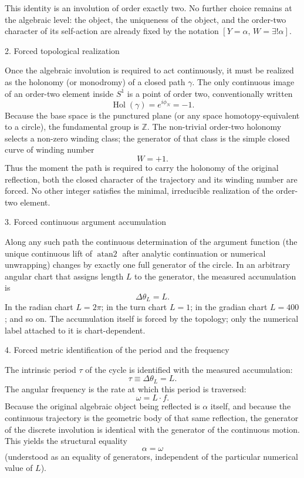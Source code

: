 This identity is an involution of order exactly two. No further choice remains at the algebraic level: the object, the uniqueness of the object, and the order-two character of its self-action are already fixed by the notation \([Y=\alpha,\,W=\exists!\alpha]\).

2. Forced topological realization

Once the algebraic involution is required to act continuously, it must be realized as the holonomy (or monodromy) of a closed path \(\gamma\). The only continuous image of an order-two element inside \(S^1\) is a point of order two, conventionally written
\[
\operatorname{Hol}(\gamma)=e^{i\phi_N}=-1.
\]
Because the base space is the punctured plane (or any space homotopy-equivalent to a circle), the fundamental group is \(\mathbb{Z}\). The non-trivial order-two holonomy selects a non-zero winding class; the generator of that class is the simple closed curve of winding number
\[
W=+1.
\]
Thus the moment the path is required to carry the holonomy of the original reflection, both the closed character of the trajectory and its winding number are forced. No other integer satisfies the minimal, irreducible realization of the order-two element.

3. Forced continuous argument accumulation

Along any such path the continuous determination of the argument function (the unique continuous lift of \(\operatorname{atan2}\) after analytic continuation or numerical unwrapping) changes by exactly one full generator of the circle. In an arbitrary angular chart that assigns length \(L\) to the generator, the measured accumulation is
\[
\Delta\theta_L=L.
\]
In the radian chart \(L=2\pi\); in the turn chart \(L=1\); in the gradian chart \(L=400\); and so on. The accumulation itself is forced by the topology; only the numerical label attached to it is chart-dependent.

4. Forced metric identification of the period and the frequency

The intrinsic period \(\tau\) of the cycle is identified with the measured accumulation:
\[
\tau\equiv\Delta\theta_L=L.
\]
The angular frequency is the rate at which this period is traversed:
\[
\omega=L\cdot f.
\]
Because the original algebraic object being reflected is \(\alpha\) itself, and because the continuous trajectory is the geometric body of that same reflection, the generator of the discrete involution is identical with the generator of the continuous motion. This yields the structural equality
\[
\alpha=\omega
\]
(understood as an equality of generators, independent of the particular numerical value of \(L\)).

